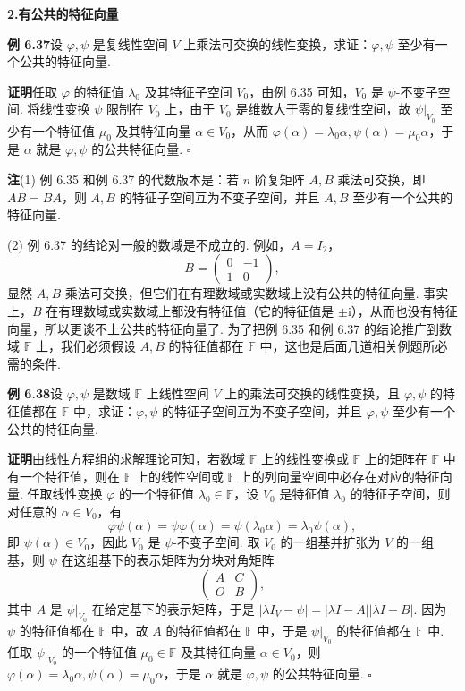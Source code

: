 \documentclass[UTF8,12pt,a4paper,fontset=fandol]{ctexart}
\begin{document}
\noindent\textbf{2.\quad 有公共的特征向量}

\noindent\textbf{例 6.37}\quad 设 $\varphi,\psi$ 是复线性空间 $V$ 上乘法可交换的线性变换，求证：$\varphi,\psi$ 至少有一个公共的特征向量.

\noindent\textbf{证明}\quad 任取 $\varphi$ 的特征值 $\lambda_0$ 及其特征子空间 $V_0$，由例 6.35 可知，$V_0$ 是 $\psi$-不变子空间. 将线性变换 $\psi$ 限制在 $V_0$ 上，由于 $V_0$ 是维数大于零的复线性空间，故 $\psi|_{V_0}$ 至少有一个特征值 $\mu_0$ 及其特征向量 $\alpha\in V_0$，从而 $\varphi(\alpha)=\lambda_0\alpha,\psi(\alpha)=\mu_0\alpha$，于是 $\alpha$ 就是 $\varphi,\psi$ 的公共特征向量. $\square$

\noindent\textbf{注}\quad (1) 例 6.35 和例 6.37 的代数版本是：若 $n$ 阶复矩阵 $A,B$ 乘法可交换，即 $AB=BA$，则 $A,B$ 的特征子空间互为不变子空间，并且 $A,B$ 至少有一个公共的特征向量.

(2) 例 6.37 的结论对一般的数域是不成立的. 例如，$A=I_2$，
\[
B=\left(\begin{array}{cc}
0 & -1\\
1 & 0
\end{array}\right),
\]
显然 $A,B$ 乘法可交换，但它们在有理数域或实数域上没有公共的特征向量. 事实上，$B$ 在有理数域或实数域上都没有特征值（它的特征值是 $\pm\mathrm{i}$），从而也没有特征向量，所以更谈不上公共的特征向量了. 为了把例 6.35 和例 6.37 的结论推广到数域 $\mathbb{F}$ 上，我们必须假设 $A,B$ 的特征值都在 $\mathbb{F}$ 中，这也是后面几道相关例题所必需的条件.

\noindent\textbf{例 6.38}\quad 设 $\varphi,\psi$ 是数域 $\mathbb{F}$ 上线性空间 $V$ 上的乘法可交换的线性变换，且 $\varphi,\psi$ 的特征值都在 $\mathbb{F}$ 中，求证：$\varphi,\psi$ 的特征子空间互为不变子空间，并且 $\varphi,\psi$ 至少有一个公共的特征向量.

\noindent\textbf{证明}\quad 由线性方程组的求解理论可知，若数域 $\mathbb{F}$ 上的线性变换或 $\mathbb{F}$ 上的矩阵在 $\mathbb{F}$ 中有一个特征值，则在 $\mathbb{F}$ 上的线性空间或 $\mathbb{F}$ 上的列向量空间中必存在对应的特征向量. 任取线性变换 $\varphi$ 的一个特征值 $\lambda_0\in\mathbb{F}$，设 $V_0$ 是特征值 $\lambda_0$ 的特征子空间，则对任意的 $\alpha\in V_0$，有
\[
\varphi\psi(\alpha)=\psi\varphi(\alpha)=\psi(\lambda_0\alpha)=\lambda_0\psi(\alpha),
\]
即 $\psi(\alpha)\in V_0$，因此 $V_0$ 是 $\psi$-不变子空间. 取 $V_0$ 的一组基并扩张为 $V$ 的一组基，则 $\psi$ 在这组基下的表示矩阵为分块对角矩阵
\[
\left(\begin{array}{cc}
A & C\\
O & B
\end{array}\right),
\]
其中 $A$ 是 $\psi|_{V_0}$ 在给定基下的表示矩阵，于是 $|\lambda I_V-\psi|=|\lambda I-A||\lambda I-B|$. 因为 $\psi$ 的特征值都在 $\mathbb{F}$ 中，故 $A$ 的特征值都在 $\mathbb{F}$ 中，于是 $\psi|_{V_0}$ 的特征值都在 $\mathbb{F}$ 中. 任取 $\psi|_{V_0}$ 的一个特征值 $\mu_0\in\mathbb{F}$ 及其特征向量 $\alpha\in V_0$，则 $\varphi(\alpha)=\lambda_0\alpha,\psi(\alpha)=\mu_0\alpha$，于是 $\alpha$ 就是 $\varphi,\psi$ 的公共特征向量. $\square$
\end{document}
